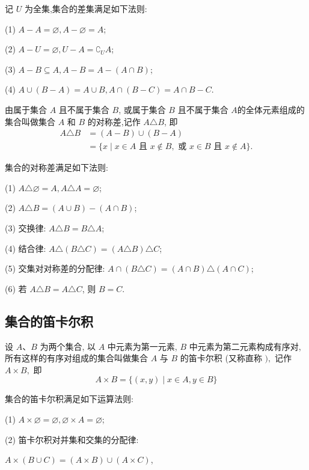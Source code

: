 记 $U$ 为全集,集合的差集满足如下法则:

(1) $A-A=\varnothing, A-\varnothing=A$;

(2) $A-U=\varnothing, U-A=\complement_{U} A$;

(3) $A-B \subseteq A, A-B=A-(A \cap B)$;

(4) $A \cup(B-A)=A \cup B, A \cap(B-C)=A \cap B-C$.

\begin{definition}
	由属于集合 $A$ 且不属于集合 $B$, 或属于集合 $B$ 且不属于集合 $A$的全体元素组成的集合叫做集合 $A$ 和 $B$ 的对称差,记作 $A \triangle B$, 即
	$$
		\begin{aligned}
			A \triangle B & =(A-B) \cup(B-A)                                                                         \\
			              & =\{x \mid x \in A \text { 且 } x \notin B, \text { 或 } x \in B \text { 且 } x \notin A\} .
		\end{aligned}
	$$
\end{definition}

集合的对称差满足如下法则:

(1) $A \triangle \varnothing=A, A \triangle A=\varnothing$;

(2) $A \triangle B=(A \cup B)-(A \cap B)$;

(3) 交换律: $A \triangle B=B \triangle A$;

(4) 结合律: $A \triangle(B \triangle C)=(A \triangle B) \triangle C$;

(5) 交集对对称差的分配律: $A \cap(B \triangle C)=(A \cap B) \triangle(A \cap C)$;

(6) 若 $A \triangle B=A \triangle C$, 则 $B=C$.

\subsection{集合的笛卡尔积}
\begin{definition}
	设 $A 、 B$ 为两个集合, 以 $A$ 中元素为第一元素, $B$ 中元素为第二元素构成有序对, 所有这样的有序对组成的集合叫做集合 $A$ 与 $B$ 的笛卡尔积 (又称直称 $),$ 记作 $A \times B , $ 即
	$$
		A \times B=\{(x, y) \mid x \in A, y \in B\}
	$$
\end{definition}
集合的笛卡尔积满足如下运算法则:

(1) $A \times \varnothing=\varnothing, \varnothing \times A=\varnothing$;

(2) 笛卡尔积对并集和交集的分配律:

$A \times(B \cup C)=(A \times B) \cup(A \times C)$,

